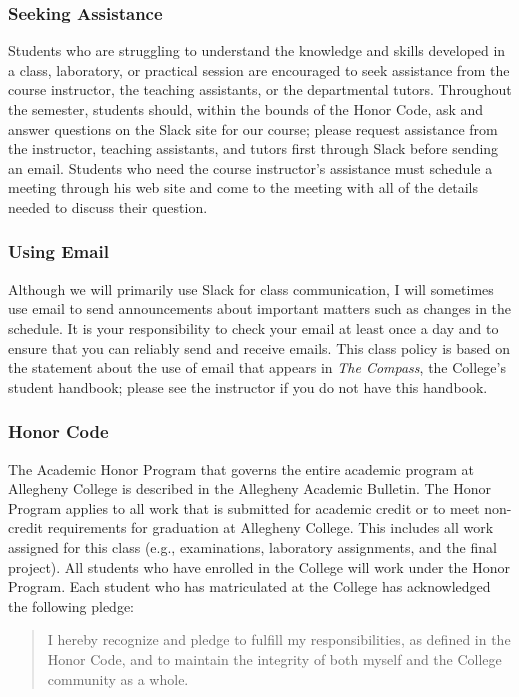 \documentclass[11pt]{article}
\begin{document}
\subsubsection*{Seeking Assistance}

Students who are struggling to understand the knowledge and skills developed in a class, laboratory, or practical
session are encouraged to seek assistance from the course instructor, the teaching assistants, or the departmental
tutors. Throughout the semester, students should, within the bounds of the Honor Code, ask and answer questions on the
Slack site for our course; please request assistance from the instructor, teaching assistants, and tutors first through
Slack before sending an email. Students who need the course instructor's assistance must schedule a meeting through his
web site and come to the meeting with all of the details needed to discuss their question.

\subsubsection*{Using Email}

Although we will primarily use Slack for class communication, I will sometimes use email to send announcements about
important matters such as changes in the schedule. It is your responsibility to check your email at least once a day and
to ensure that you can reliably send and receive emails. This class policy is based on the statement about the use of
email that appears in {\em The Compass}, the College's student handbook; please see the instructor if you do not have
this handbook.

\subsubsection*{Honor Code}

The Academic Honor Program that governs the entire academic program at Allegheny College is described in the Allegheny
Academic Bulletin.  The Honor Program applies to all work that is submitted for academic credit or to meet non-credit
requirements for graduation at Allegheny College.  This includes all work assigned for this class (e.g., examinations,
laboratory assignments, and the final project).  All students who have enrolled in the College will work under the Honor
Program.  Each student who has matriculated at the College has acknowledged the following pledge:

\vspace*{-.11in}
\begin{quote}
  I hereby recognize and pledge to fulfill my responsibilities, as defined in the Honor Code, and to maintain the
  integrity of both myself and the College community as a whole.
\end{quote}
\vspace*{-.11in}
\end{document}
